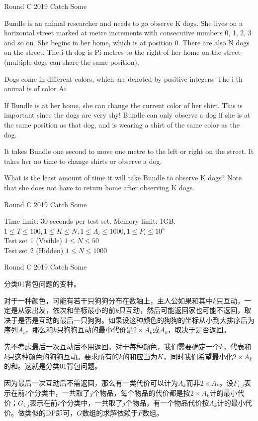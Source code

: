 \documentclass{beamer}
\begin{document}
\begin{frame}{Round C 2019 Catch Some}

    Bundle is an animal researcher and needs to go observe K dogs. She lives on a horizontal street marked at metre increments with consecutive numbers 0, 1, 2, 3 and so on. She begins in her home, which is at position 0. There are also N dogs on the street. The i-th dog is Pi metres to the right of her home on the street (multiple dogs can share the same position).
    
    Dogs come in different colors, which are denoted by positive integers. The i-th animal is of color Ai.
    
    If Bundle is at her home, she can change the current color of her shirt. This is important since the dogs are very shy! Bundle can only observe a dog if she is at the same position as that dog, and is wearing a shirt of the same color as the dog.
    
    It takes Bundle one second to move one metre to the left or right on the street. It takes her no time to change shirts or observe a dog.
    
    What is the least amount of time it will take Bundle to observe K dogs? Note that she does not have to return home after observing K dogs.
    
\end{frame}

\begin{frame}{Round C 2019 Catch Some}

    Time limit: 30 seconds per test set. Memory limit: 1GB.\\
    $1\leq T\leq 100, 1\leq K\leq N, 1\leq A_i\leq 1000, 1\leq P_i\leq 10^5$\\
    Test set 1 (Visible) $1\leq N\leq 50$\\
    Test set 2 (Hidden) $1\leq N\leq 1000$
    
\end{frame}

\begin{frame}{Round C 2019 Catch Some}

    分类01背包问题的变种。
    
    对于一种颜色，可能有若干只狗狗分布在数轴上，主人公如果和其中$k$只互动，一定是从家出发，依次和坐标最小的前$k$只互动，然后可能返回家也可能不返回，取决于是否是互动的最后一只狗狗。如果设这种颜色的狗狗的坐标从小到大排序后为序列$A_i$，那么和$k$只狗狗互动的最小代价是$2\times A_k$或$A_k$，取决于是否返回。
    
    先不考虑最后一次互动后不用返回。对于每种颜色，我们需要确定一个$k$，代表和$k$只这种颜色的狗狗互动。要求所有的$k$的和应当为$K$，同时我们希望最小化$2 \times A_k$的和。这就是分类01背包问题。
    
    因为最后一次互动后不需返回，那么有一类代价可以计为$A_k$而非$2\times A_k$。设$F_{i,j}$表示在前$i$个分类中，一共取了$j$个物品，每个物品的代价都是按$2\times A_k$计的最小代价；$G_{i,j}$表示在前$i$个分类中，一共取了$j$个物品，有一个物品代价按$A_k$计的最小代价。做类似的DP即可，$G$数组的求解依赖于$F$数组。
    
\end{frame}
\end{document}
